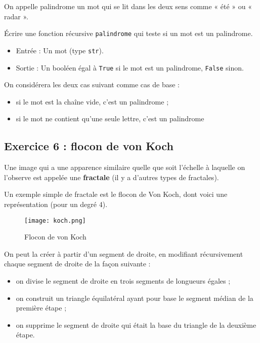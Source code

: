 \documentclass[
  a4paper,
  DIV=11,
  numbers=noendperiod]{scrartcl}
\providecommand{\tightlist}{%
  \setlength{\itemsep}{0pt}\setlength{\parskip}{0pt}}\usepackage{longtable,booktabs,array}
\begin{document}
On appelle palindrome un mot qui se lit dans les deux sens comme « été »
ou « radar ».

Écrire une fonction récursive \texttt{palindrome} qui teste si un mot
est un palindrome.

\begin{itemize}
\tightlist
\item
  Entrée : Un mot (type \texttt{str}).
\item
  Sortie : Un booléen égal à \texttt{True} si le mot est un palindrome,
  \texttt{False} sinon.
\end{itemize}

On considérera les deux cas suivant comme cas de base :

\begin{itemize}
\tightlist
\item
  si le mot est la chaîne vide, c'est un palindrome ;
\item
  si le mot ne contient qu'une seule lettre, c'est un palindrome
\end{itemize}

\hypertarget{fa-solid-pencil-alt-fa-desktop-exercice-6-flocon-de-von-koch}{%
\subsection{\texorpdfstring{ 
Exercice 6 : flocon de von
Koch}{  Exercice 6 : flocon de von Koch}}\label{fa-solid-pencil-alt-fa-desktop-exercice-6-flocon-de-von-koch}}

Une image qui a une apparence similaire quelle que soit l'échelle à
laquelle on l'observe est appelée une \textbf{fractale} (il y a d'autres
types de fractales).

Un exemple simple de fractale est le flocon de Von Koch, dont voici une
représentation (pour un degré 4).

\begin{figure}

{\centering \texttt{[image: koch.png]}

}

\caption{Flocon de von Koch}

\end{figure}

On peut la créer à partir d'un segment de droite, en modifiant
récursivement chaque segment de droite de la façon suivante :

\begin{itemize}
\tightlist
\item
  on divise le segment de droite en trois segments de longueurs égales ;
\item
  on construit un triangle équilatéral ayant pour base le segment médian
  de la première étape ;
\item
  on supprime le segment de droite qui était la base du triangle de la
  deuxième étape.
\end{itemize}
\end{document}
